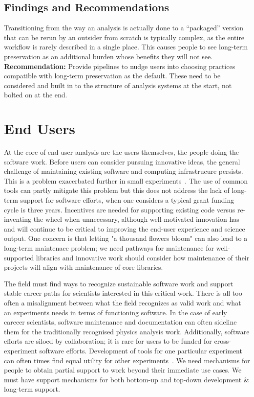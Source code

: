 \subsection{Findings and Recommendations}
Transitioning from the way an analysis is actually done to a “packaged” version that can be rerun by an outsider from scratch is typically complex, as the entire workflow is rarely described in a single place. This causes people to see long-term preservation as an additional burden whose benefits they will not see.\\
\textbf{Recommendation:} Provide pipelines to nudge users into choosing practices compatible with long-term preservation as the default. These need to be considered and built in to the structure of analysis systems at the start, not bolted on at the end.

\section{End Users}

At the core of end user analysis are the users themselves, the people doing the software work. Before users can consider pursuing innovative ideas, the general challenge of maintaining existing software and computing infrastrucure persists. This is a problem exacerbated further in small experiments~\cite{arxiv.2203.07645}. The use of common tools can partly mitigate this problem but this does not address the lack of long-term support for software efforts, when one considers a typical grant funding cycle is three years. Incentives are needed for supporting existing code versus re-inventing the wheel when unnecessary, although well-motivated innovation has and will continue to be critical to improving the end-user experience and science output. One concern is that letting "a thousand flowers bloom" can also lead to a long-term maintenace problem; we need pathways for maintenance for well-supported libraries and innovative work should consider how maintenance of their projects will align with maintenance of core libraries. 

The field must find ways to recognize sustainable software work and support stable career paths for scientists interested in this critical work. There is all too often a misalignment between what the field recognizes as valid work and what an experiments needs in terms of functioning software. In the case of early careeer scientists, software maintenance and documentation can often sideline them for the traditionally recognised physics analysis work. Additionally, software efforts are siloed by collaboration; it is rare for users to be funded for cross-experiment software efforts. Development of tools for one particular experiment can often times find equal utility for other experiments~\cite{arxiv.2203.13768}. We need mechanisms for people to obtain partial support to work beyond their immediate use cases. We must have support mechanisms for both bottom-up and top-down development \& long-term support.

